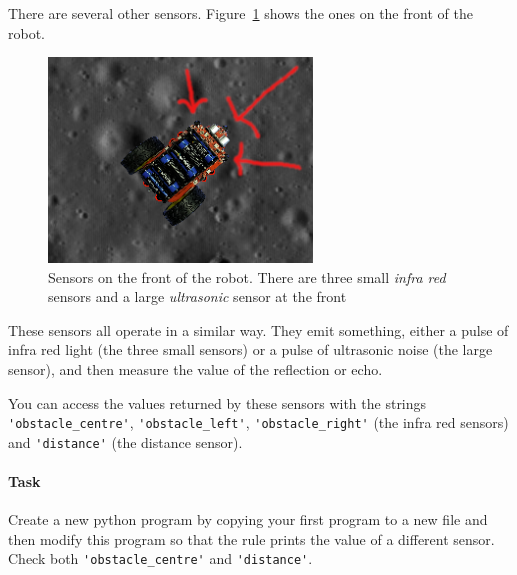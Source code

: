 \documentclass[a4,12pt]{article}
\begin{document}
There are several other sensors.  Figure~\ref{fig:distance_sensors} shows the ones on the front of the robot.
\begin{figure}[htbp]
  \begin{center}
    \includegraphics[width=7cm]{images/distance_sensors.png}
  \end{center}
  \caption{Sensors on the front of the robot.  There are three small \emph{infra red} sensors and a large \emph{ultrasonic} sensor at the front}
  \label{fig:distance_sensors}
\end{figure}
These sensors all operate in a similar way.  They emit something, either a pulse of infra red light (the three small sensors) or a pulse of ultrasonic noise (the large sensor), and then measure the value of the reflection or echo.

You can access the values returned by these sensors with the strings \lstinline{'obstacle_centre'}, \lstinline{'obstacle_left'}, \lstinline{'obstacle_right'} (the infra red sensors) and \lstinline{'distance'} (the distance sensor).

\paragraph{Task} Create a new python program by copying your first program to a new file and then modify this program so that the rule prints the value of a different sensor.  Check both \lstinline{'obstacle_centre'} and \lstinline{'distance'}.

\medskip

\end{document}
